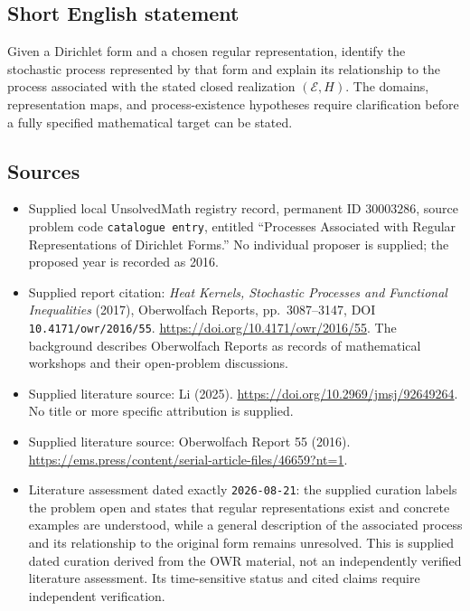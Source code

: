 \documentclass[11pt]{article}
\begin{document}
\subsection{Short English statement}
Given a Dirichlet form and a chosen regular representation, identify the stochastic process represented by that form and explain its relationship to the process associated with the stated closed realization \((\mathcal E,H)\). The domains, representation maps, and process-existence hypotheses require clarification before a fully specified mathematical target can be stated.
\subsection{Sources}
\begin{itemize}
\item Supplied local UnsolvedMath registry record, permanent ID \(30003286\), source problem code \texttt{catalogue entry}, entitled ``Processes Associated with Regular Representations of Dirichlet Forms.'' No individual proposer is supplied; the proposed year is recorded as 2016.
\item Supplied report citation: \emph{Heat Kernels, Stochastic Processes and Functional Inequalities} (2017), Oberwolfach Reports, pp.~3087--3147, DOI \texttt{10.4171/owr/2016/55}. \url{https://doi.org/10.4171/owr/2016/55}. The background describes Oberwolfach Reports as records of mathematical workshops and their open-problem discussions.
\item Supplied literature source: Li (2025). \url{https://doi.org/10.2969/jmsj/92649264}. No title or more specific attribution is supplied.
\item Supplied literature source: Oberwolfach Report 55 (2016). \url{https://ems.press/content/serial-article-files/46659?nt=1}.
\item Literature assessment dated exactly \texttt{2026-08-21}: the supplied curation labels the problem open and states that regular representations exist and concrete examples are understood, while a general description of the associated process and its relationship to the original form remains unresolved. This is supplied dated curation derived from the OWR material, not an independently verified literature assessment. Its time-sensitive status and cited claims require independent verification.
\end{itemize}
\end{document}
